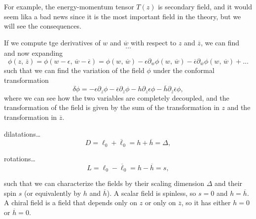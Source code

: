 For example, the energy-momentum tensor \(T(z)\) is secondary field, and it would seem lika a bad news since it is the most important field in the theory, but we will see the consequences.

If we compute tge derivatives of \(w\) and \(\overline{w}\) with respect to \(z\) and \(\overline{z}\), we can find
\[
    \dots
\]
and now expanding
\[
    \phi(z, \, \overline{z}) = \phi(w - \epsilon, \, \overline{w} - \overline{\epsilon}) = \phi(w, \, \overline{w}) - \epsilon \partial_w \phi(w, \, \overline{w}) - \overline{\epsilon} \partial_{\overline{w}} \phi(w, \, \overline{w}) + \dots
\]
such that we can find the variation of the field \(\phi\) under the conformal transformation
\[
    \delta \phi = - \epsilon \partial_z \phi - \overline{\epsilon} \partial_{\overline{z}} \phi - h \partial_z \epsilon \phi - \overline{h} \partial_{\overline{z}} \overline{\epsilon} \phi,
\]
where we can see how the two variables are completely decoupled, and the transformation of the field is given by the sum of the transformation in \(z\) and the transformation in \(\overline{z}\).

dilatations\dots
\[
    D = \ell_0 + \overline{\ell}_0 = h + \overline{h} = \Delta,
\]

rotations\dots
\[
    L = \ell_0 - \overline{\ell}_0 = h - \overline{h} = s,
\]

such that we can characterize the fields by their scaling dimension \(\Delta\) and their spin \(s\) (or equivalently by \(h\) and \(\overline{h}\)). A scalar field is spinless, so \(s=0\) and \(h = \overline{h}\). A chiral field is a field that depends only on \(z\) or only on \(\overline{z}\), so it has either \(h=0\) or \(\overline{h}=0\).